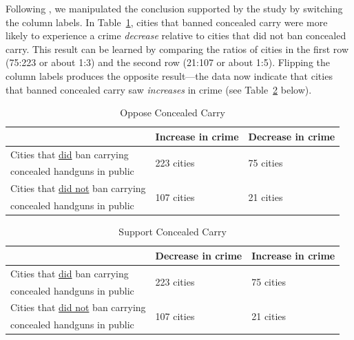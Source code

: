 \documentclass[12pt,letterpaper]{article}
\begin{document}
Following \citet{kahan2017}, we manipulated the conclusion supported by the study by switching the column labels. In Table~\ref{tab:antigun}, cities that banned concealed carry were more likely to experience a crime {\it decrease} relative to cities that did not ban concealed carry. This result can be learned by comparing the ratios of cities in the first row (75:223 or about 1:3) and the second row (21:107 or about 1:5). Flipping the column labels produces the opposite result---the data now indicate that cities that banned concealed carry saw {\it increases} in crime (see Table~\ref{tab:progun} below).

\singlespacing
\begin{table}[h]
\centering
\caption {Oppose Concealed Carry} \label{tab:antigun}
\begin{tabular}{|l|l|l|}
\hline 
  & Increase in crime  & Decrease in crime \\\hline
  Cities that \underline{did} ban carrying     & \multirow{2}{*}{223 cities} & \multirow{2}{*}{75 cities} \\ 
  concealed handguns in public           &               & \\ \hline
  Cities that \underline{did not} ban carrying & \multirow{2}{*}{107 cities} & \multirow{2}{*}{21 cities} \\ 
  concealed handguns in public           &               &  \\\hline
\end{tabular}
\end{table}

\begin{table}[h]
\centering
\caption {Support Concealed Carry} \label{tab:progun}
\begin{tabular}{|l|l|l|}
\hline 
  & Decrease in crime & Increase in crime \\\hline
  Cities that \underline{did} ban carrying     & \multirow{2}{*}{223 cities} & \multirow{2}{*}{75 cities} \\ 
  concealed handguns in public           &               & \\ \hline
  Cities that \underline{did not} ban carrying & \multirow{2}{*}{107 cities} & \multirow{2}{*}{21 cities} \\ 
  concealed handguns in public           &               &  \\\hline
\end{tabular}
\end{table}
\doublespacing
\vspace{5mm}
\end{document}
